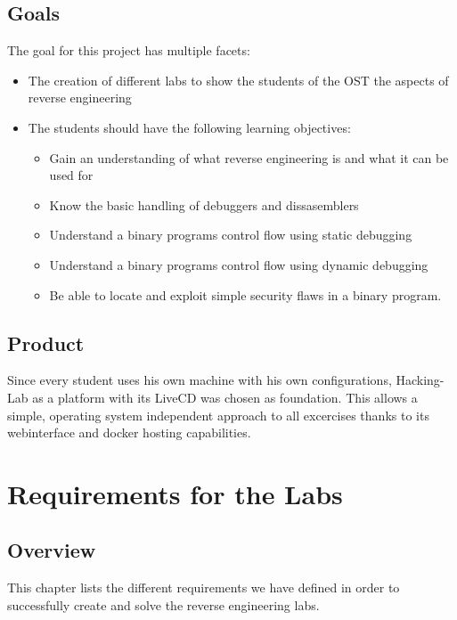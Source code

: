 \subsection{Goals}
The goal for this project has multiple facets:
\begin{itemize}
    \item The creation of different labs to show the students of the OST the aspects of reverse engineering
    \item The students should have the following learning objectives:
    \begin{itemize}
        \item Gain an understanding of what reverse engineering is and what it can be used for
        \item Know the basic handling of debuggers and dissasemblers
        \item Understand a binary programs control flow using static debugging
        \item Understand a binary programs control flow using dynamic debugging
        \item Be able to locate and exploit simple security flaws in a binary program.
    \end{itemize}
\end{itemize}

\subsection{Product}
Since every student uses his own machine with his own configurations, Hacking-Lab as a platform with its LiveCD was chosen as foundation. This allows a simple, operating system independent approach to all excercises thanks to its webinterface and docker hosting capabilities. 

\section{Requirements for the Labs}

\subsection{Overview}
This chapter lists the different requirements we have defined in order to successfully create and solve the reverse engineering labs.
